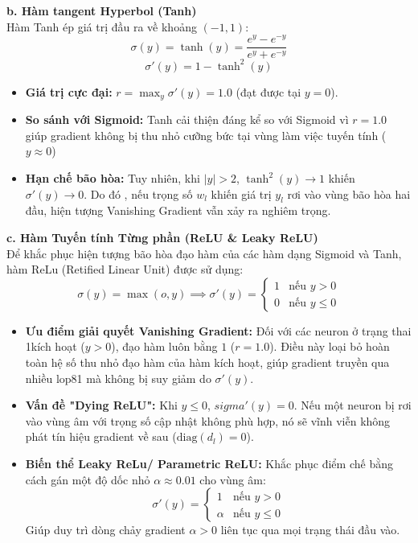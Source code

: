 \documentclass[12pt]{article}
\begin{document}
\textbf{b. Hàm tangent Hyperbol (Tanh)}\\
Hàm Tanh ép giá trị đầu ra về khoảng $(-1, 1)$:
\begin{equation}
    \sigma(y) = \tanh(y) = \frac{e^y - e^{-y}}{e^y + e^{-y}}
\end{equation}
\begin{equation}
    \sigma'(y) = 1 - \tanh^2(y)
\end{equation}

\begin{itemize}
    \item \textbf{Giá trị cực đại:} $r = \max_y \sigma'(y) = 1.0$ (đạt được tại $y = 0$).
    \item \textbf{So sánh với Sigmoid:} Tanh cải thiện đáng kể so với Sigmoid vì $r = 1.0$ giúp gradient không bị thu nhỏ cưỡng bức tại vùng làm việc tuyến tính ($y \approx 0 $)
    \item \textbf{Hạn chế bão hòa:} Tuy nhiên, khi $|y| > 2$, $\tanh^2(y) \to 1$ khiến $\sigma'(y) \to 0$. Do đó , nếu trọng số $w_l$ khiến giá trị $y_l$ rơi vào vùng bão hòa hai đầu, hiện tượng Vanishing Gradient vẫn xảy ra nghiêm trọng.
\end{itemize}

\textbf{c. Hàm Tuyến tính Từng phần (ReLU \& Leaky ReLU)}\\
Để khắc phục hiện tượng bão hòa đạo hàm của các hàm dạng Sigmoid và Tanh, hàm ReLu (Retified Linear Unit) được sử dụng:
\begin{equation}
    \sigma(y) = \max(o, y) \implies \sigma'(y) = \begin{cases} 1 & \text{nếu } y > 0 \\ 0 & \text{nếu } y \le 0 \end{cases}
\end{equation}
\begin{itemize}
    \item \textbf{Ưu điểm giải quyết Vanishing Gradient:} Đối với các neuron ở trạng thai 1kích hoạt ($y > 0$), đạo hàm luôn bằng $1$ ($r = 1.0$). Điều này loại bỏ hoàn toàn hệ số thu nhỏ đạo hàm của hàm kích hoạt, giúp gradient truyền qua nhiều lop81 mà không bị suy giảm do $\sigma'(y)$.
    \item \textbf{Vấn đề "Dying ReLU":} Khi $y \le 0$, $sigma'(y) = 0$. Nếu một neuron bị rơi vào vùng âm với trọng số cập nhật không phù hợp, nó sẽ vĩnh viễn không phát tín hiệu gradient về sau ($\text{diag}(d_l) = 0$).
    \item \textbf{Biến thể Leaky ReLu/ Parametric ReLU:} Khắc phục điểm chế bằng cách gán một độ dốc nhỏ $\alpha \approx 0.01$ cho vùng âm:
    \begin{equation}
        \sigma'(y) = \begin{cases} 1 & \text{nếu } y > 0 \\  \alpha & \text{nếu } y \le 0 \end{cases}
    \end{equation}
    Giúp duy trì dòng chảy gradient $\alpha >0 $ liên tục qua mọi trạng thái đầu vào.
\end{itemize}
\end{document}
